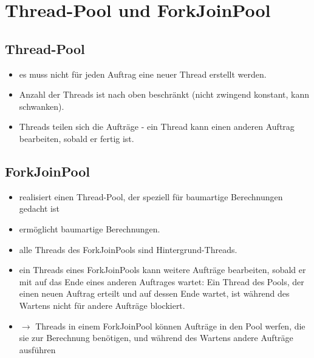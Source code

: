 \section{Thread-Pool und ForkJoinPool}

\subsection{Thread-Pool}

\begin{itemize}
    \item es muss nicht für jeden Auftrag eine neuer Thread erstellt werden.
    \item Anzahl der Threads ist nach oben beschränkt (nicht zwingend konstant, kann schwanken).
    \item Threads teilen sich die Aufträge - ein Thread kann einen anderen Auftrag bearbeiten, sobald er fertig ist.
\end{itemize}

\subsection{ForkJoinPool}

\begin{itemize}
    \item realisiert einen Thread-Pool, der speziell für baumartige Berechnungen gedacht ist
    \item ermöglicht baumartige Berechnungen.
    \item alle Threads des ForkJoinPools sind Hintergrund-Threads.
    \item ein Threads eines ForkJoinPools kann weitere Aufträge bearbeiten, sobald er mit  auf das Ende eines anderen Auftrages wartet: Ein Thread des Pools, der einen neuen Auftrag erteilt und auf dessen Ende wartet, ist während des Wartens nicht für andere Aufträge blockiert.
    \item[] $\rightarrow$ Threads in einem ForkJoinPool können Aufträge in den Pool werfen, die sie zur Berechnung benötigen, und während des Wartens andere Aufträge ausführen
\end{itemize}
